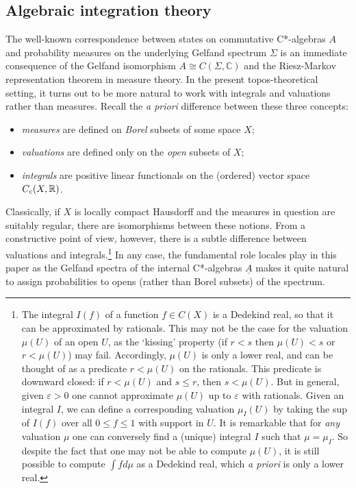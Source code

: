 \documentclass[12pt]{article}
\newcommand{\ca}{C*-algebra} \newcommand{\jba}{JB-algebra}
\newcommand{\Sg}{\Sigma} \newcommand{\ta}{\tau} \newcommand{\ph}{\phi}
\newcommand{\C}{{\mathbb C}} \newcommand{\D}{{\mathbb D}}
\newcommand{\uA}{\underline{A}}
\begin{document}
\subsection{Algebraic integration theory}\label{ss:th-integrals}
The well-known correspondence between states on commutative \ca s $A$ and
probability measures
on the underlying Gelfand spectrum $\Sg$ is an immediate consequence of the
Gelfand isomorphism
$A\cong C(\Sg,\C)$ and the Riesz-Markov representation theorem in measure
theory.
In the present  topos-theoretical setting, it turns out to be more natural
to work with integrals and valuations rather than measures.
 Recall the {\it a priori} difference between these three concepts:
\begin{itemize}
\item {\it measures} are defined on {\it Borel} subsets of some space $X$;
\item  {\it valuations}  are
defined only on the {\it open} subsets of $X$;
\item  {\it integrals}
are positive linear functionals on the (ordered) vector space $C_c(X,{\mathbb R})$.
\end{itemize}
Classically, if $X$ is locally compact Hausdorff and the measures in
question are suitably regular, there are isomorphisms between these
notions. From a constructive point of view, however, there is a
subtle difference between valuations and integrals.\footnote{The
integral $I(f)$ of a function $f \in C(X)$ is a Dedekind real, so that
it can be approximated by rationals. This may not be the case for the
valuation $\mu (U)$ of an open $U$, as the `kissing' property
(if $r<s$ then $\mu (U) < s$ or $r<\mu (U)$) may fail. Accordingly,
$\mu (U)$ is only a lower real, and can be thought of as a
predicate $r < \mu (U)$ on the rationals. This predicate is downward
closed: if $r < \mu (U)$ and $s \leqslant r$, then $s < \mu (U)$. But in
general, given $\varepsilon > 0$ one cannot approximate $\mu(U)$ up to
$\varepsilon$ with rationals. Given an integral $I$, we can define a
corresponding valuation $\mu_I (U)$ by taking the sup of $I (f)$ over
all $0 \leqslant f \leqslant 1$ with support in $U$. It is remarkable that for
\textit{any} valuation $\mu$ one can
conversely find a (unique) integral $I$ such that $\mu = \mu_I$. So
despite the fact that one may not be able to compute $\mu (U)$, it is
still possible to compute $\int fd \mu$ as a Dedekind real, which \textit{a
priori} is only a lower real.}
In any case, the fundamental role  locales play in this paper as the
Gelfand spectra of the internal C*-algebras $\uA$ makes it quite
natural to assign probabilities to opens (rather than Borel subsets)
of the spectrum.
\end{document}
